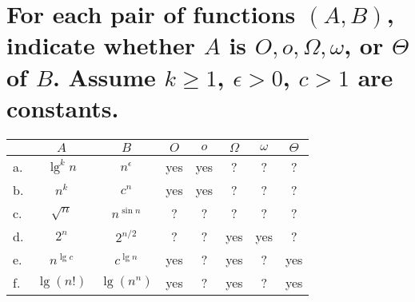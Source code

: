 \section[Problem 5]{For each pair of functions $(A, B)$, indicate whether $A$ is $O, o, \Omega, \omega$, or $\Theta$ of $B$. Assume $k \geq 1$, $\epsilon > 0$, $c > 1$ are constants.}
\begin{center}
	\begin{tabular}{lcc|c|c|c|c|c}
		& $A$ & $B$ & $O$ & $o$ & $\Omega$ & $\omega$ & $\Theta$ \\ \hline
		a. & $\lg^k n$ & $n^{\epsilon}$ & yes & yes & ? & ? & ? \\ \hline
		b. & $n^k$ & $c^n$				& yes & yes & ? & ? & ? \\ \hline
		c. & $\sqrt{n}$ & $n^{\sin n}$	& ? & ? & ? & ? & ? \\ \hline
		d. & $2^n$ & $2^{n/2}$			& ? & ? & yes & yes & ? \\ \hline
		e. & $n^{\lg c}$ & $c^{\lg n}$	& yes & ? & yes & ? & yes \\ \hline
		f. & $\lg(n!)$ & $\lg(n^n)$		& yes & ? & yes & ? & yes 
	\end{tabular}
\end{center}


